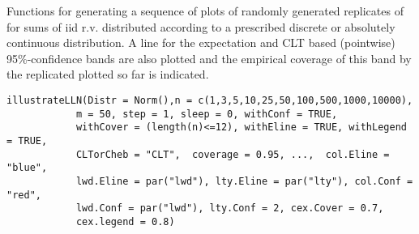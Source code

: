 \documentclass{article}
\begin{document}
\begin{Description}\relax
Functions for generating a sequence of plots of
randomly generated replicates of 
for sums of iid r.v. distributed according to a prescribed discrete or 
absolutely continuous distribution. A line for the expectation and CLT based
(pointwise) 95\%-confidence bands are also plotted and the empirical coverage
of this band by the replicated plotted so far is indicated.
\end{Description}
\begin{Usage}
\begin{verbatim}illustrateLLN(Distr = Norm(),n = c(1,3,5,10,25,50,100,500,1000,10000), 
            m = 50, step = 1, sleep = 0, withConf = TRUE, 
            withCover = (length(n)<=12), withEline = TRUE, withLegend = TRUE,
            CLTorCheb = "CLT",  coverage = 0.95, ...,  col.Eline = "blue", 
            lwd.Eline = par("lwd"), lty.Eline = par("lty"), col.Conf = "red", 
            lwd.Conf = par("lwd"), lty.Conf = 2, cex.Cover = 0.7, 
            cex.legend = 0.8)
\end{verbatim}
\end{Usage}
\end{document}
